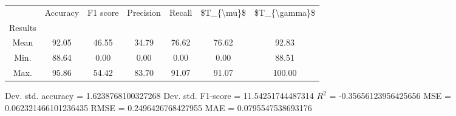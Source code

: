 \begin{tabular}{|c|c|c|c|c|c|c|}
\toprule
{} &  Accuracy &  F1 score &  Precision &  Recall &  \$T\_\{\textbackslash mu\}\$ &  \$T\_\{\textbackslash gamma\}\$ \\
Results &           &           &            &         &            &               \\
\hline
Mean    &     92.05 &     46.55 &      34.79 &   76.62 &      76.62 &         92.83 \\
Min.    &     88.64 &      0.00 &       0.00 &    0.00 &       0.00 &         88.51 \\
Max.    &     95.86 &     54.42 &      83.70 &   91.07 &      91.07 &        100.00 \\
\bottomrule
\end{tabular}

 Dev. std. accuracy = 1.6238768100327268
 Dev. std. F1-score = 11.54251744487314
 $R^2$ = -0.35656123956425656
 MSE = 0.062321466101236435
 RMSE = 0.2496426768427955
 MAE = 0.0795547538693176
